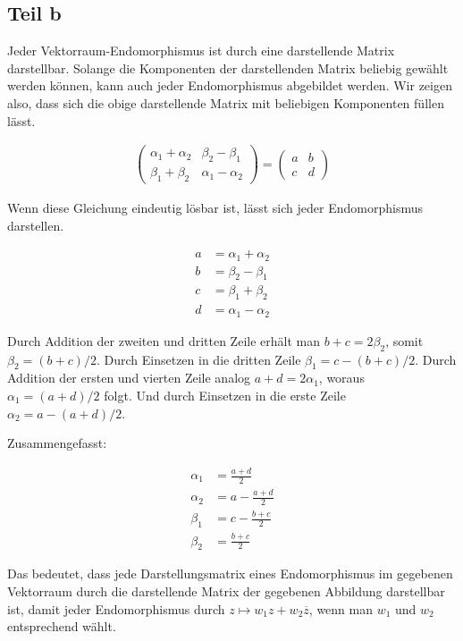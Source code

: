 \documentclass[a4paper,german,12pt,smallheadings]{scrartcl}
\begin{document}
\subsection*{Teil b}

Jeder Vektorraum-Endomorphismus ist durch eine darstellende Matrix darstellbar.
Solange die Komponenten der darstellenden Matrix beliebig gewählt werden
können, kann auch jeder Endomorphismus abgebildet werden. Wir zeigen also, dass
sich die obige darstellende Matrix mit beliebigen Komponenten füllen lässt.

\begin{align*}
  \begin{pmatrix} \alpha_1+\alpha_2 & \beta_2 - \beta_1 \\ \beta_1+\beta_2 & \alpha_1-\alpha_2 \end{pmatrix} = \begin{pmatrix} a & b \\ c & d\end{pmatrix}
\end{align*}

Wenn diese Gleichung eindeutig lösbar ist, lässt sich jeder Endomorphismus
darstellen.

\begin{align*}
  a &= \alpha_1 + \alpha_2 \\
  b &= \beta_2 - \beta_1 \\
  c &= \beta_1+\beta_2 \\
  d &= \alpha_1 - \alpha_2
\end{align*}

Durch Addition der zweiten und dritten Zeile erhält man $b+c = 2\beta_2$, somit
$\beta_2 = (b+c)/2$. Durch Einsetzen in die dritten Zeile $\beta_1 = c -
(b+c)/2$. Durch Addition der ersten und vierten Zeile analog $a+d = 2\alpha_1$,
woraus $\alpha_1 = (a+d)/2$ folgt. Und durch Einsetzen in die erste Zeile
$\alpha_2 = a - (a+d)/2$.

Zusammengefasst:

\begin{align*}
  \alpha_1 &= \frac{a+d}{2} \\
  \alpha_2 &= a - \frac{a+d}{2} \\
  \beta_1  &= c - \frac{b+c}{2} \\
  \beta_2  &= \frac{b+c}{2}
\end{align*}

Das bedeutet, dass jede Darstellungsmatrix eines Endomorphismus im gegebenen
Vektorraum durch die darstellende Matrix der gegebenen Abbildung darstellbar
ist, damit jeder Endomorphismus durch $z \mapsto w_1z + w_2\overline{z}$, wenn
man $w_1$ und $w_2$ entsprechend wählt.
\end{document}

